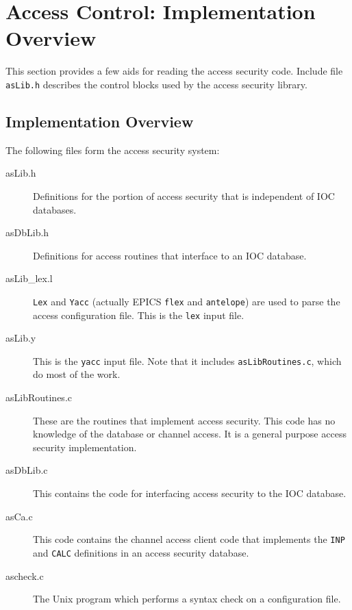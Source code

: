 \section{Access Control: Implementation Overview}

This section provides a few aids for reading the access security code. Include file \verb|asLib.h| describes the control blocks 
used by the access security library. 

\subsection{Implementation Overview}

The following files form the access security system:

\begin{description}
\item[asLib.h]

Definitions for the portion of access security that is independent of IOC databases.

\item[asDbLib.h]

Definitions for access routines that interface to an IOC database.

\item[asLib\_lex.l]

\verb|Lex| and \verb|Yacc| (actually EPICS \verb|flex| and \verb|antelope|) are used to parse the access configuration file. This is the \verb|lex| input file.

\item[asLib.y]

This is the \verb|yacc| input file. Note that it includes \verb|asLibRoutines.c|, which do most of the work.

\item[asLibRoutines.c]

These are the routines that implement access security. This code has no knowledge of the database or channel access. It is a general purpose access security implementation.

\item[asDbLib.c]

This contains the code for interfacing access security to the IOC database.

\item[asCa.c]

This code contains the channel access client code that implements the \verb|INP| and \verb|CALC| definitions in an access security database.

\item[ascheck.c]

The Unix program which performs a syntax check on a configuration file.
\end{description}

